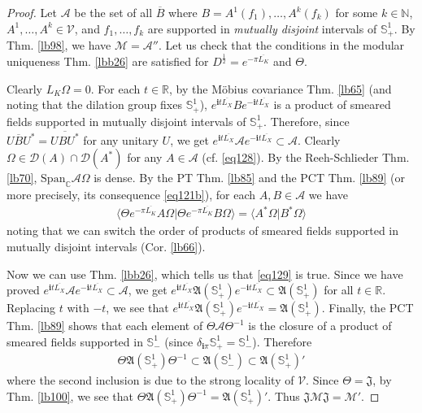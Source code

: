 \documentclass[12pt,b5paper,notitlepage]{article}
\theoremstyle{definition}
\theoremstyle{plain}
\newcommand{\fk}{\mathfrak}
\newcommand{\mc}{\mathcal}
\newcommand{\ovl}{\overline}
\newcommand{\Dom}{\scr{D}}
\newcommand{\Span}{\mathrm{Span}}
\newcommand{\bk}[1]{\langle {#1}\rangle}
\newcommand{\scr}{\mathscr}
\newcommand{\im}{\mathbf{i}}
\newcommand{\Cbb}{\mathbb C}
\newcommand{\Nbb}{\mathbb N}
\newcommand{\Rbb}{\mathbb R}
\newcommand{\Sbb}{{\mathbb S}}
\newcommand{\MV}{\mathcal V}
\numberwithin{equation}{section}
\begin{document}
\begin{proof}
Let $\scr A$ be the set of all $\ovl B$ where $B=A^1(f_1),\dots,A^k(f_k)$ for some $k\in\Nbb$, $A^1,\dots,A^k\in\MV$, and $f_1,\dots,f_k$ are supported in \textit{mutually disjoint} intervals of $\Sbb^1_+$. By Thm. \ref{lb98}, we have $\mc M=\scr A''$. Let us check that the conditions in the modular uniqueness Thm. \ref{lbb26} are satisfied for $D^{\frac 12}=e^{-\pi\ovl{L_K}}$ and $\Theta$. 

Clearly $L_K\Omega=0$. For each $t\in\Rbb$, by the M\"obius covariance Thm. \ref{lb65} (and noting that the dilation group fixes $\Sbb^1_+$),  $e^{\im t\ovl{L_X}} Be^{-\im t\ovl{L_X}}$ is a product of smeared fields supported in mutually disjoint intervals of $\Sbb^1_+$. Therefore, since $U\ovl B U^*=\ovl{UBU^*}$ for any unitary $U$, we get $e^{\im t\ovl{L_X}}\scr Ae^{-\im t\ovl{L_X}}\subset\scr A$. Clearly $\Omega\in\Dom(A)\cap\Dom(A^*)$ for any $A\in\scr A$ (cf. \eqref{eq128}). By the Reeh-Schlieder Thm. \ref{lb70}, $\Span_\Cbb\scr A\Omega$ is dense. By the PT Thm. \ref{lb85} and the PCT Thm. \ref{lb89} (or more precisely, its consequence \eqref{eq121b}), for each $A,B\in\scr A$ we have
\begin{align*}
\bk{\Theta e^{-\pi\ovl{L_K}}A\Omega|\Theta e^{-\pi\ovl{L_K}}B\Omega}=\bk{A^*\Omega|B^*\Omega}
\end{align*}
noting that we can switch the order of products of smeared fields supported in mutually disjoint intervals (Cor. \ref{lb66}). 

Now we can use Thm. \ref{lbb26}, which tells us that \eqref{eq129} is true. Since we have proved $e^{\im t\ovl{L_X}}\scr Ae^{-\im t\ovl{L_X}}\subset\scr A$, we get $e^{\im t\ovl{L_X}}\fk A(\Sbb^1_+)e^{-\im t\ovl{L_X}}\subset\fk A(\Sbb^1_+)$ for all $t\in\Rbb$. Replacing $t$ with $-t$, we see that $e^{\im t\ovl{L_X}}\fk A(\Sbb^1_+)e^{-\im t\ovl{L_X}}=\fk A(\Sbb^1_+)$. Finally, the PCT Thm. \ref{lb89} shows that each element of $\Theta\scr A\Theta^{-1}$ is the closure of a product of smeared fields supported in $\Sbb^1_-$ (since $\delta_{\im\pi}\Sbb^1_+=\Sbb^1_-$). Therefore 
\begin{align}\label{eq130}
\Theta\fk A(\Sbb^1_+)\Theta^{-1}\subset\fk A(\Sbb^1_-)\subset\fk A(\Sbb^1_+)'
\end{align}
where the second inclusion is due to the strong locality of $\MV$. Since $\Theta=\fk J$, by Thm. \ref{lb100}, we see that $\Theta\fk A(\Sbb^1_+)\Theta^{-1}=\fk A(\Sbb^1_+)'$. Thus $\fk J\mc M\fk J=\mc M'$.
\end{proof}
\end{document}
